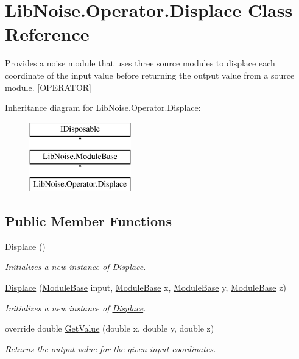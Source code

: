\hypertarget{class_lib_noise_1_1_operator_1_1_displace}{}\section{Lib\+Noise.\+Operator.\+Displace Class Reference}
\label{class_lib_noise_1_1_operator_1_1_displace}


Provides a noise module that uses three source modules to displace each coordinate of the input value before returning the output value from a source module. \mbox{[}O\+P\+E\+R\+A\+T\+OR\mbox{]}  


Inheritance diagram for Lib\+Noise.\+Operator.\+Displace\+:\begin{figure}[H]
\begin{center}
\leavevmode
\includegraphics[height=3.000000cm]{class_lib_noise_1_1_operator_1_1_displace}
\end{center}
\end{figure}
\subsection*{Public Member Functions}
\begin{DoxyCompactItemize}
\item 
\hyperlink{class_lib_noise_1_1_operator_1_1_displace_afc80e16dd23e8d92264d41de12352c78}{Displace} ()
\begin{DoxyCompactList}\small\item\em Initializes a new instance of \hyperlink{class_lib_noise_1_1_operator_1_1_displace}{Displace}. \end{DoxyCompactList}\item 
\hyperlink{class_lib_noise_1_1_operator_1_1_displace_a02bac2dd3d5894a80f722d595a1ccaac}{Displace} (\hyperlink{class_lib_noise_1_1_module_base}{Module\+Base} input, \hyperlink{class_lib_noise_1_1_module_base}{Module\+Base} x, \hyperlink{class_lib_noise_1_1_module_base}{Module\+Base} y, \hyperlink{class_lib_noise_1_1_module_base}{Module\+Base} z)
\begin{DoxyCompactList}\small\item\em Initializes a new instance of \hyperlink{class_lib_noise_1_1_operator_1_1_displace}{Displace}. \end{DoxyCompactList}\item 
override double \hyperlink{class_lib_noise_1_1_operator_1_1_displace_a877879477548d3f23032bfd37d7c8a3a}{Get\+Value} (double x, double y, double z)
\begin{DoxyCompactList}\small\item\em Returns the output value for the given input coordinates. \end{DoxyCompactList}\end{DoxyCompactItemize}
